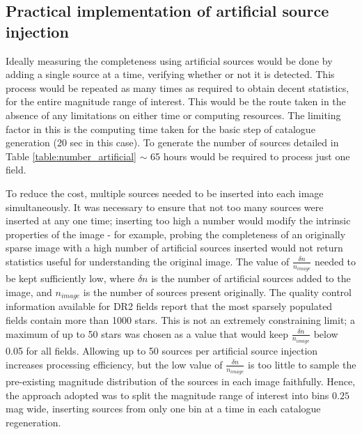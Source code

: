 \documentclass[a4paper,useAMS,usenatbib]{mn2e}
\begin{document}
\subsection{Practical implementation of artificial source injection}

Ideally measuring the completeness using artificial sources would be done by adding a single source 
at a time, verifying whether or not it is detected. This process would be repeated as many times as required 
to obtain decent statistics, for the entire magnitude range of interest. This would be the route taken in the 
absence of any limitations on either time or computing resources.   The limiting factor in this 
is the computing time taken for the basic step of catalogue generation (20 sec in this case).  To generate the 
number of sources detailed in Table \ref{table:number_artificial} $\sim$ 65 hours would be required to process 
just one field.

To reduce the cost, multiple sources needed to be inserted into each image simultaneously. It was necessary to 
ensure that not too many sources were inserted at any one time; inserting too high a number would modify the intrinsic 
properties of the image - for example, probing the completeness of an originally sparse image with a high number of 
artificial sources inserted would not return statistics useful for understanding the original image. The value of 
$\frac{\delta n}{n_{image}}$ needed to be kept sufficiently low, where $\delta n$ is the number of artificial sources 
added to the image, and $n_{image}$ is the number of sources present originally. The quality control 
information available for DR2 fields report that the most sparsely populated fields contain more than 1000 stars. This 
is not an extremely constraining limit; a maximum of up to 50 stars was chosen as a value that would keep 
$\frac{\delta n}{n_{image}}$ below 0.05 for all fields.   Allowing up to 50 sources per artificial source injection 
increases processing efficiency, but the low value of $\frac{\delta n}{n_{image}}$ is too little to sample the 
pre-existing magnitude distribution of the sources in each image faithfully.  Hence, the approach adopted was to 
split the magnitude range of interest into bins $0.25$ mag wide, inserting sources from only one bin at a time in each 
catalogue regeneration.
\end{document}
